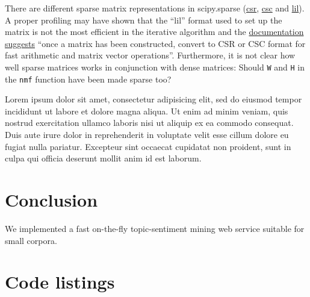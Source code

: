 \documentclass[10pt]{IEEEtran}
\begin{document}
There are different sparse matrix representations in scipy.sparse
(\href{http://docs.scipy.org/doc/scipy/reference/generated/scipy.sparse.csr_matrix.html}{csr}, 
\href{http://docs.scipy.org/doc/scipy/reference/generated/scipy.sparse.csc_matrix.html}{csc}
and 
\href{http://docs.scipy.org/doc/scipy/reference/generated/scipy.sparse.lil_matrix.html}{lil}). 
A proper profiling may have shown that the ``lil'' format used to set up
the matrix is not the most efficient in the iterative algorithm and
the
\href{http://docs.scipy.org/doc/scipy/reference/generated/scipy.sparse.lil_matrix.html}{documentation
  suggests} ``once a matrix has been constructed, convert to CSR or
CSC format for fast arithmetic and matrix vector operations''.
Furthermore, it is not clear how well sparse matrices works in
conjunction with dense matrices: Should {\tt W} and {\tt H} in the
{\tt nmf} function have been made sparse too?

Lorem ipsum dolor sit amet, consectetur adipisicing elit, sed do
eiusmod tempor incididunt ut labore et dolore magna aliqua. Ut enim ad
minim veniam, quis nostrud exercitation ullamco laboris nisi ut
aliquip ex ea commodo consequat. Duis aute irure dolor in
reprehenderit in voluptate velit esse cillum dolore eu fugiat nulla
pariatur. Excepteur sint occaecat cupidatat non proident, sunt in
culpa qui officia deserunt mollit anim id est laborum.


\section{Conclusion}

We implemented a fast on-the-fly topic-sentiment mining web service suitable
for small corpora.






\clearpage
\onecolumn
\appendices
\section{Code listings}

\lstlistoflistings

\label{listing:PBA}
\end{document}
